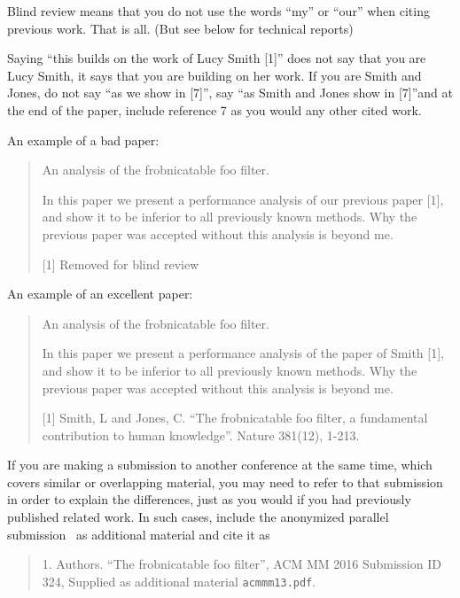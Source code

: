 \documentclass{article}
\begin{document}
Blind review means that you do not use the words ``my'' or ``our'' when citing previous work. That is all. (But see below for technical reports)

Saying ``this builds on the work of Lucy Smith [1]'' does not say that you are Lucy Smith, it says that you are building on her work. If you are Smith and Jones, do not say ``as we show in [7]'', say ``as Smith and Jones show in [7]''and at the end of the paper, include reference 7 as you would any other cited work.

An example of a bad paper:
\begin{quote}
  \begin{center}
    An analysis of the frobnicatable foo filter.
  \end{center}

  In this paper we present a performance analysis of our
  previous paper [1], and show it to be inferior to all
  previously known methods. Why the previous paper was
  accepted without this analysis is beyond me.

    [1] Removed for blind review
\end{quote}

An example of an excellent paper:

\begin{quote}
  \begin{center}
    An analysis of the frobnicatable foo filter.
  \end{center}

  In this paper we present a performance analysis of the
  paper of Smith [1], and show it to be inferior to
  all previously known methods.  Why the previous paper
  was accepted without this analysis is beyond me.

    [1] Smith, L and Jones, C. ``The frobnicatable foo
  filter, a fundamental contribution to human knowledge''.
  Nature 381(12), 1-213.
\end{quote}

If you are making a submission to another conference at the same time, which covers similar or overlapping material, you may need to refer to that submission in order to explain the differences, just as you would if you had previously published related work. In such cases, include the anonymized parallel submission~\cite{Authors12} as additional material and cite it as

\begin{quote}
  1. Authors. ``The frobnicatable foo filter'', ACM MM 2016 Submission ID 324, Supplied as additional material {\tt acmmm13.pdf}.
\end{quote}
\end{document}
